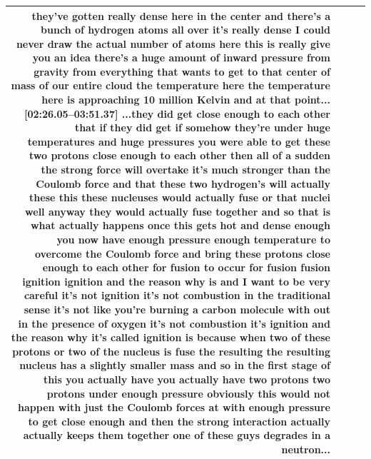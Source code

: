 \documentclass[10pt]{article}
\begin{document}
\begin{tiny}
\begin{longtable}{|r|p{0.375in}|p{1.275in}|p{3.5in}|}
they've gotten really dense here in the center and there's a bunch of hydrogen atoms all over it's really dense I could never draw the actual number of atoms here this is really give you an idea there's a huge amount of inward pressure from gravity from everything that wants to get to that center of mass of our entire cloud the temperature here the temperature here is approaching 10 million Kelvin and at that point...\newline\textbf{[02:26.05--03:51.37]} ...they did get close enough to each other that if they did get if somehow they're under huge temperatures and huge pressures you were able to get these two protons close enough to each other then all of a sudden the strong force will overtake it's much stronger than the Coulomb force and that these two hydrogen's will actually these this these nucleuses would actually fuse or that nuclei well anyway they would actually fuse together and so that is what actually happens once this gets hot and dense enough you now have enough pressure enough temperature to overcome the Coulomb force and bring these protons close enough to each other for fusion to occur for fusion fusion ignition ignition and the reason why is and I want to be very careful it's not ignition it's not combustion in the traditional sense it's not like you're burning a carbon molecule with out in the presence of oxygen it's not combustion it's ignition and the reason why it's called ignition is because when two of these protons or two of the nucleus is fuse the resulting the resulting nucleus has a slightly smaller mass and so in the first stage of this you actually have you actually have two protons two protons under enough pressure obviously this would not happen with just the Coulomb forces at with enough pressure to get close enough and then the strong interaction actually actually keeps them together one of these guys degrades in a neutron... \\\hline

\end{longtable}
\end{tiny}
\end{document}

